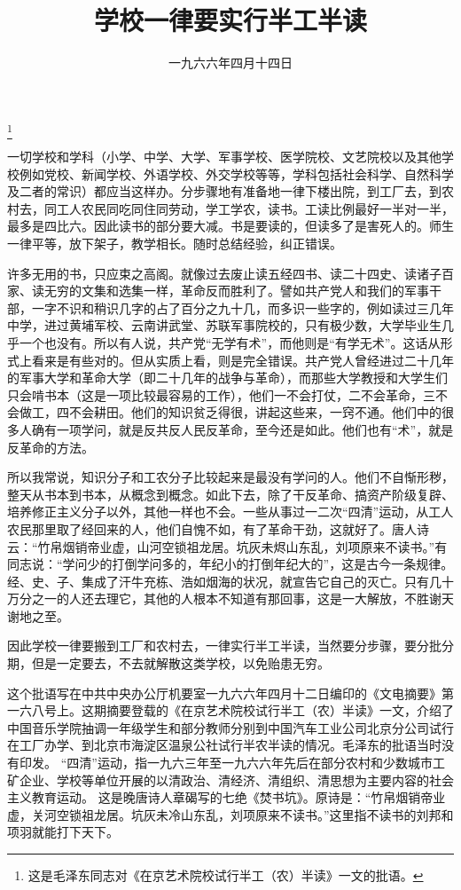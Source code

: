 
\title{学校一律要实行半工半读}
\date{一九六六年四月十四日}
\thanks{这是毛泽东同志对《在京艺术院校试行半工（农）半读》一文的批语。}
\maketitle


一切学校和学科（小学、中学、大学、军事学校、医学院校、文艺院校以及其他学校例如党校、新闻学校、外语学校、外交学校等等，学科包括社会科学、自然科学及二者的常识）都应当这样办。分步骤地有准备地一律下楼出院，到工厂去，到农村去，同工人农民同吃同住同劳动，学工学农，读书。工读比例最好一半对一半，最多是四比六。因此读书的部分要大减。书是要读的，但读多了是害死人的。师生一律平等，放下架子，教学相长。随时总结经验，纠正错误。

许多无用的书，只应束之高阁。就像过去废止读五经四书、读二十四史、读诸子百家、读无穷的文集和选集一样，革命反而胜利了。譬如共产党人和我们的军事干部，一字不识和稍识几字的占了百分之九十几，而多识一些字的，例如读过三几年中学，进过黄埔军校、云南讲武堂、苏联军事院校的，只有极少数，大学毕业生几乎一个也没有。所以有人说，共产党“无学有术”，而他则是“有学无术”。这话从形式上看来是有些对的。但从实质上看，则是完全错误。共产党人曾经进过二十几年的军事大学和革命大学（即二十几年的战争与革命），而那些大学教授和大学生们只会啃书本（这是一项比较最容易的工作），他们一不会打仗，二不会革命，三不会做工，四不会耕田。他们的知识贫乏得很，讲起这些来，一窍不通。他们中的很多人确有一项学问，就是反共反人民反革命，至今还是如此。他们也有“术”，就是反革命的方法。

所以我常说，知识分子和工农分子比较起来是最没有学问的人。他们不自惭形秽，整天从书本到书本，从概念到概念。如此下去，除了干反革命、搞资产阶级复辟、培养修正主义分子以外，其他一样也不会。一些从事过一二次“四清”运动，从工人农民那里取了经回来的人，他们自愧不如，有了革命干劲，这就好了。唐人诗云：“竹帛烟销帝业虚，山河空锁祖龙居。坑灰未烬山东乱，刘项原来不读书。”有同志说：“学问少的打倒学问多的，年纪小的打倒年纪大的”，这是古今一条规律。经、史、子、集成了汗牛充栋、浩如烟海的状况，就宣告它自己的灭亡。只有几十万分之一的人还去理它，其他的人根本不知道有那回事，这是一大解放，不胜谢天谢地之至。

因此学校一律要搬到工厂和农村去，一律实行半工半读，当然要分步骤，要分批分期，但是一定要去，不去就解散这类学校，以免贻患无穷。

\begin{maonote}
这个批语写在中共中央办公厅机要室一九六六年四月十二日编印的《文电摘要》第一六八号上。这期摘要登载的《在京艺术院校试行半工（农）半读》一文，介绍了中国音乐学院抽调一年级学生和部分教师分别到中国汽车工业公司北京分公司试行在工厂办学、到北京市海淀区温泉公社试行半农半读的情况。毛泽东的批语当时没有印发。
“四清”运动，指一九六三年至一九六六年先后在部分农村和少数城市工矿企业、学校等单位开展的以清政治、清经济、清组织、清思想为主要内容的社会主义教育运动。
这是晚唐诗人章碣写的七绝《焚书坑》。原诗是：“竹帛烟销帝业虚，关河空锁祖龙居。坑灰未冷山东乱，刘项原来不读书。”这里指不读书的刘邦和项羽就能打下天下。
\end{maonote}
